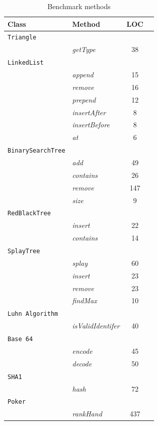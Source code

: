 \begin{table}[t]
\vspace*{-1.2cm}
\centering
\small
\begin{tabular}{llcc}
\toprule
\textbf{Class} & \textbf{Method} & \textbf{LOC} \\
\toprule
\texttt{Triangle} & & \\
           & \textit{getType} & 38      \\
\hline
\texttt{LinkedList} & & \\
           & \textit{append} & 15       \\
           & \textit{remove} & 16       \\
           & \textit{prepend} & 12      \\
           & \textit{insertAfter} & 8   \\
           & \textit{insertBefore} & 8  \\
           & \textit{at} & 6            \\
\hline
\texttt{BinarySearchTree} & &     \\
           & \emph{add} & 49      \\
           & \emph{contains} & 26 \\
           & \emph{remove} & 147  \\
           & \emph{size} & 9      \\
\hline
\texttt{RedBlackTree} & &         \\
           & \emph{insert} & 22   \\
           & \emph{contains} & 14 \\
\hline
\texttt{SplayTree} & &             \\
           & \emph{splay} & 60 \\
           & \emph{insert} & 23 \\
           & \emph{remove} & 23 \\
           & \emph{findMax} & 10 \\
\hline
\texttt{Luhn Algorithm} & &     \\
           & \emph{isValidIdentifer} & 40 \\
\hline
\texttt{Base 64} & &     \\
           & \emph{encode} & 45 \\
           & \emph{decode} & 50 \\
\hline
\texttt{SHA1} & &             \\
           & \emph{hash} & 72 \\
\hline
\texttt{Poker} & &                 \\
           & \emph{rankHand} & 437 \\
\hline
\end{tabular}
\caption{Benchmark methods}
\label{benchmarktests}
\end{table}

